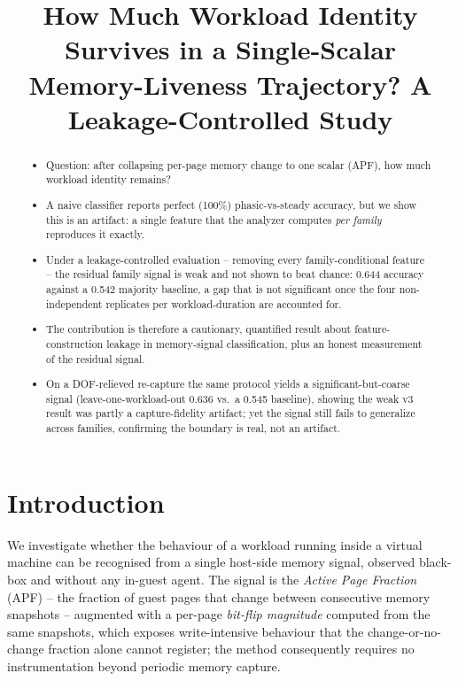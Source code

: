 \documentclass[conference]{IEEEtran}
\title{How Much Workload Identity Survives in a Single-Scalar\\
Memory-Liveness Trajectory? A Leakage-Controlled Study}
\author{\IEEEauthorblockN{TODO Author list}
\IEEEauthorblockA{TODO Affiliation}}
\begin{document}
\maketitle

\begin{abstract}
\begin{itemize}
  \item Question: after collapsing per-page memory change to one scalar (APF),
        how much workload identity remains?
  \item A naive classifier reports perfect (100\%) phasic-vs-steady accuracy,
        but we show this is an artifact: a single feature that the analyzer
        computes \emph{per family} reproduces it exactly.
  \item Under a leakage-controlled evaluation -- removing every
        family-conditional feature -- the residual family signal is weak and not
        shown to beat chance: 0.644 accuracy against a 0.542 majority baseline,
        a gap that is not significant once the four non-independent replicates
        per workload-duration are accounted for.
  \item The contribution is therefore a cautionary, quantified result about
        feature-construction leakage in memory-signal classification, plus an
        honest measurement of the residual signal.
  \item On a DOF-relieved re-capture the same protocol yields a
        significant-but-coarse signal (leave-one-workload-out 0.636 vs.\ a 0.545
        baseline), showing the weak v3 result was partly a capture-fidelity
        artifact; yet the signal still fails to generalize across families,
        confirming the boundary is real, not an artifact.
\end{itemize}
\end{abstract}

\section{Introduction}

We investigate whether the behaviour of a workload running inside a virtual machine
can be recognised from a single host-side memory signal, observed black-box and without
any in-guest agent. The signal is the \emph{Active Page Fraction} (APF) -- the fraction
of guest pages that change between consecutive memory snapshots -- augmented with a
per-page \emph{bit-flip magnitude} computed from the same snapshots, which exposes
write-intensive behaviour that the change-or-no-change fraction alone cannot register;
the method consequently requires no instrumentation beyond periodic memory capture.
\end{document}
